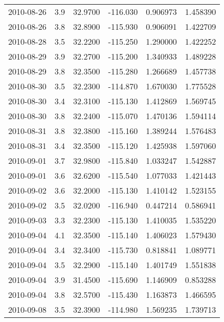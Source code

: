 \begin{tabular}{lrrrrr}
2010-08-26 &       3.9 &  32.9700 &  -116.030 &         0.906973 &         1.458390 \\
2010-08-26 &       3.8 &  32.8900 &  -115.930 &         0.906091 &         1.422709 \\
2010-08-28 &       3.5 &  32.2200 &  -115.250 &         1.290000 &         1.422252 \\
2010-08-29 &       3.9 &  32.2700 &  -115.200 &         1.340933 &         1.489228 \\
2010-08-29 &       3.8 &  32.3500 &  -115.280 &         1.266689 &         1.457738 \\
2010-08-30 &       3.5 &  32.2300 &  -114.870 &         1.670030 &         1.775528 \\
2010-08-30 &       3.4 &  32.3100 &  -115.130 &         1.412869 &         1.569745 \\
2010-08-30 &       3.8 &  32.2400 &  -115.070 &         1.470136 &         1.594114 \\
2010-08-31 &       3.8 &  32.3800 &  -115.160 &         1.389244 &         1.576483 \\
2010-08-31 &       3.4 &  32.3500 &  -115.120 &         1.425938 &         1.597060 \\
2010-09-01 &       3.7 &  32.9800 &  -115.840 &         1.033247 &         1.542887 \\
2010-09-01 &       3.6 &  32.6200 &  -115.540 &         1.077033 &         1.421443 \\
2010-09-02 &       3.6 &  32.2000 &  -115.130 &         1.410142 &         1.523155 \\
2010-09-02 &       3.5 &  32.0200 &  -116.940 &         0.447214 &         0.586941 \\
2010-09-03 &       3.3 &  32.2300 &  -115.130 &         1.410035 &         1.535220 \\
2010-09-04 &       4.1 &  32.3500 &  -115.140 &         1.406023 &         1.579430 \\
2010-09-04 &       3.4 &  32.3400 &  -115.730 &         0.818841 &         1.089771 \\
2010-09-04 &       3.5 &  32.2900 &  -115.140 &         1.401749 &         1.551838 \\
2010-09-04 &       3.9 &  31.4500 &  -115.690 &         1.146909 &         0.853288 \\
2010-09-04 &       3.8 &  32.5700 &  -115.430 &         1.163873 &         1.466595 \\
2010-09-08 &       3.5 &  32.3900 &  -114.980 &         1.569235 &         1.739713 \\

\end{tabular}
